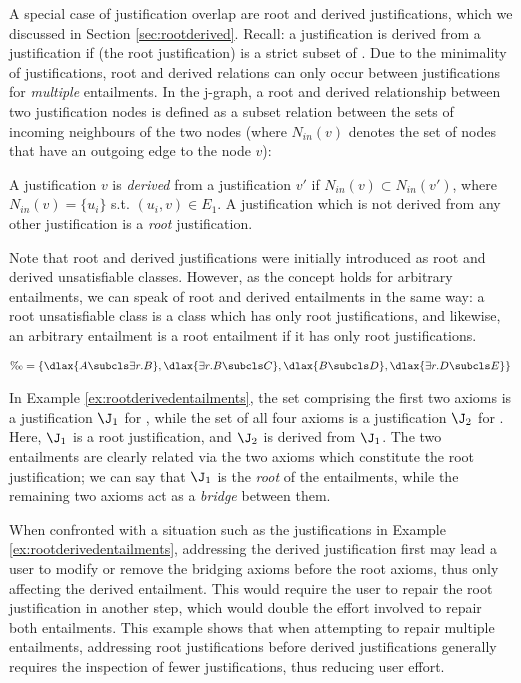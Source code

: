 A special case of justification overlap are root and derived justifications, which we discussed in Section \ref{sec:rootderived}. Recall: a justification \jprime is derived from a justification \J if \J (the root justification) is a strict subset of \jprime. Due to the minimality of justifications, root and derived relations can only occur between justifications for \emph{multiple} entailments. In the j-graph, a root and derived relationship between two justification nodes is defined as a subset relation between the sets of incoming neighbours of the two nodes (where $N_{in}(v)$ denotes the set of nodes that have an outgoing edge to the node $v$):
\begin{defn}
A justification $v$ is \emph{derived} from a justification $v'$ if $N_{in}(v) \subset N_{in}(v')$, where $N_{in}(v) = \{u_{i}\}$ s.t. $(u_{i}, v) \in E_{1}$. A justification which is not derived from any other justification is a \emph{root} justification.
\end{defn}
Note that root and derived justifications were initially introduced as root and derived unsatisfiable classes. However, as the concept holds for arbitrary entailments, we can speak of root and derived entailments in the same way: a root unsatisfiable class is a class which has only root justifications, and likewise, an arbitrary entailment is a root entailment if it has only root justifications.
\begin{examp}
\begin{align*}
\O = \{ \dlax{A \subcls \exists r.B}, \dlax{\exists r.B \subcls C}, \dlax{B \subcls D}, \dlax{\exists r.D \subcls E} \}
\end{align*}
\label{ex:rootderivedentailments}
\end{examp}
In Example \ref{ex:rootderivedentailments}, the set comprising the first two axioms is a justification $\J_{1}$ for , while the set of all four axioms is a justification $\J_{2}$ for . Here, $\J_{1}$ is a root justification, and $\J_{2}$ is derived from $\J_{1}$. The two entailments are clearly related via the two axioms which constitute the root justification; we can say that $\J_{1}$ is the \emph{root} of the entailments, while the remaining two axioms act as a \emph{bridge} between them.

When confronted with a situation such as the justifications in Example \ref{ex:rootderivedentailments}, addressing the derived justification first may lead a user to modify or remove the bridging  axioms before the root axioms, thus only affecting the derived entailment. This would require the user to repair the root justification in another step, which would double the effort involved to repair both entailments. This example shows that when attempting to repair multiple entailments, addressing root justifications before derived justifications generally requires the inspection of fewer justifications, thus reducing user effort.


